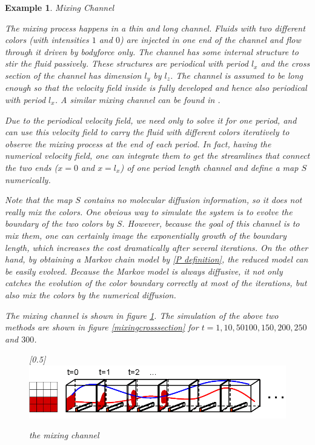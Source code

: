 \documentclass{article}
\newtheorem{example}{Example}
\begin{document}
 



\begin{example}
Mixing Channel

The mixing process happens in a thin and long channel. Fluids with two different colors (with intensities $1$ and $0$) are injected in one end of the channel and flow through it driven by bodyforce only. The channel has some internal structure to stir the fluid passively. These structures are periodical with period $l_x$ and the cross section of the channel has dimension $l_y$ by $l_z$. The channel is assumed to be long enough so that the velocity field inside is fully developed and hence also periodical with period $l_x$. A similar mixing channel can be found in \cite{Stroock2002}.

Due to the periodical velocity field, we need only to solve it for one period, and can use this velocity field to carry the fluid with different colors iteratively to observe the mixing process at the end of each period. In fact, having the numerical velocity field, one can integrate them to get the streamlines that connect the two ends ($x=0$ and $x=l_x$) of one period length channel and define a map $S$ numerically. 

Note that the map $S$ contains no molecular diffusion information, so it does not really mix the colors. One obvious way to simulate the system is to evolve the boundary of the two colors by $S$. However, because the goal of this channel is to mix them, one can certainly image the exponentially growth of the boundary length, which increases the cost dramatically after several iterations. On the other hand, by obtaining a Markov chain model by \ref{P definition}, the reduced model can be easily evolved. Because the Markov model is always diffusive, it not only catches the evolution of the color boundary correctly at most of the iterations, but also mix the colors by the numerical diffusion.     

The mixing channel is shown in figure \ref{mixingchannel}. The simulation of the above two methods are shown in figure \ref{mixingcrosssection} for $t=1,10, 50 100, 150, 200, 250$ and $300$.


\begin{figure}
 \centerline{
  \scalebox{0.5}[0.5]{\includegraphics{mixingchannel.png}}}
  \caption{the mixing channel}
  \label{mixingchannel}
\end{figure}
 

\end{example}
\end{document}

